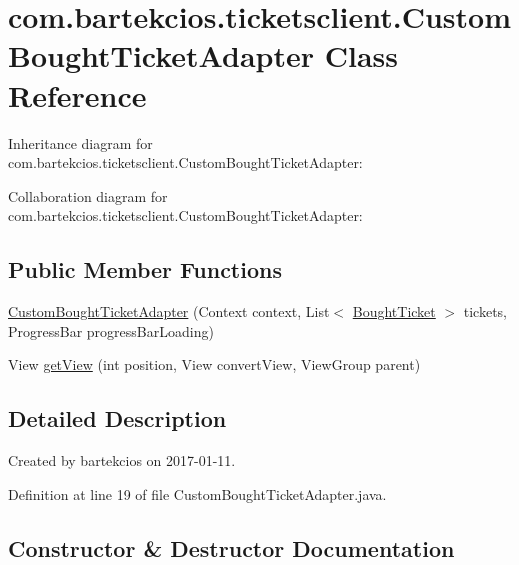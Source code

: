 \hypertarget{classcom_1_1bartekcios_1_1ticketsclient_1_1_custom_bought_ticket_adapter}{}\section{com.\+bartekcios.\+ticketsclient.\+Custom\+Bought\+Ticket\+Adapter Class Reference}
\label{classcom_1_1bartekcios_1_1ticketsclient_1_1_custom_bought_ticket_adapter}


Inheritance diagram for com.\+bartekcios.\+ticketsclient.\+Custom\+Bought\+Ticket\+Adapter\+:


Collaboration diagram for com.\+bartekcios.\+ticketsclient.\+Custom\+Bought\+Ticket\+Adapter\+:
\subsection*{Public Member Functions}
\begin{DoxyCompactItemize}
\item 
\hyperlink{classcom_1_1bartekcios_1_1ticketsclient_1_1_custom_bought_ticket_adapter_a9e705d923ebb657f965112f972862ba7}{Custom\+Bought\+Ticket\+Adapter} (Context context, List$<$ \hyperlink{classcom_1_1bartekcios_1_1ticketsclient_1_1_bought_ticket}{Bought\+Ticket} $>$ tickets, Progress\+Bar progress\+Bar\+Loading)
\item 
View \hyperlink{classcom_1_1bartekcios_1_1ticketsclient_1_1_custom_bought_ticket_adapter_aa823d02ed2bda7d3636f88373476fa3b}{get\+View} (int position, View convert\+View, View\+Group parent)
\end{DoxyCompactItemize}


\subsection{Detailed Description}
Created by bartekcios on 2017-\/01-\/11. 

Definition at line 19 of file Custom\+Bought\+Ticket\+Adapter.\+java.



\subsection{Constructor \& Destructor Documentation}
\mbox{\label{classcom_1_1bartekcios_1_1ticketsclient_1_1_custom_bought_ticket_adapter_a9e705d923ebb657f965112f972862ba7}} 
